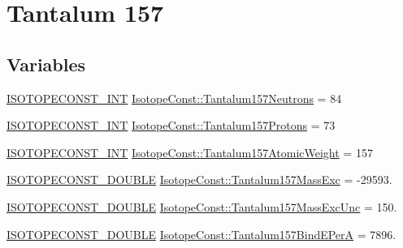 \hypertarget{group___isotope_const-_tantalum-_ta157}{}\section{Tantalum 157}
\label{group___isotope_const-_tantalum-_ta157}
\subsection*{Variables}
\begin{DoxyCompactItemize}
\item 
\mbox{\hyperlink{group___isotope_const-_macros_ga5f18360b3e99483a35c32d789e62621c}{I\+S\+O\+T\+O\+P\+E\+C\+O\+N\+S\+T\+\_\+\+I\+NT}} \mbox{\hyperlink{group___isotope_const-_tantalum-_ta157_ga85cde2cde4f9eecd3096a3ca2d758721}{Isotope\+Const\+::\+Tantalum157\+Neutrons}} = 84
\item 
\mbox{\hyperlink{group___isotope_const-_macros_ga5f18360b3e99483a35c32d789e62621c}{I\+S\+O\+T\+O\+P\+E\+C\+O\+N\+S\+T\+\_\+\+I\+NT}} \mbox{\hyperlink{group___isotope_const-_tantalum-_ta157_gab4fbc2c4ad7e1e7d5d71f15d35fc5417}{Isotope\+Const\+::\+Tantalum157\+Protons}} = 73
\item 
\mbox{\hyperlink{group___isotope_const-_macros_ga5f18360b3e99483a35c32d789e62621c}{I\+S\+O\+T\+O\+P\+E\+C\+O\+N\+S\+T\+\_\+\+I\+NT}} \mbox{\hyperlink{group___isotope_const-_tantalum-_ta157_ga21258650153b5c6cf38ac8441655fb80}{Isotope\+Const\+::\+Tantalum157\+Atomic\+Weight}} = 157
\item 
\mbox{\hyperlink{group___isotope_const-_macros_ga8f45a7272ce02c0b4c65c44636ed719a}{I\+S\+O\+T\+O\+P\+E\+C\+O\+N\+S\+T\+\_\+\+D\+O\+U\+B\+LE}} \mbox{\hyperlink{group___isotope_const-_tantalum-_ta157_ga4d6650f8ad106c3f6a9fb89d5080a9bf}{Isotope\+Const\+::\+Tantalum157\+Mass\+Exc}} = -\/29593.
\item 
\mbox{\hyperlink{group___isotope_const-_macros_ga8f45a7272ce02c0b4c65c44636ed719a}{I\+S\+O\+T\+O\+P\+E\+C\+O\+N\+S\+T\+\_\+\+D\+O\+U\+B\+LE}} \mbox{\hyperlink{group___isotope_const-_tantalum-_ta157_ga2dd4928fb6498b1eb1e2e7cb0c022025}{Isotope\+Const\+::\+Tantalum157\+Mass\+Exc\+Unc}} = 150.
\item 
\mbox{\hyperlink{group___isotope_const-_macros_ga8f45a7272ce02c0b4c65c44636ed719a}{I\+S\+O\+T\+O\+P\+E\+C\+O\+N\+S\+T\+\_\+\+D\+O\+U\+B\+LE}} \mbox{\hyperlink{group___isotope_const-_tantalum-_ta157_ga64440514bdc273be2f2912e528681b5a}{Isotope\+Const\+::\+Tantalum157\+Bind\+E\+PerA}} = 7896.
\item 

\end{DoxyCompactItemize}
